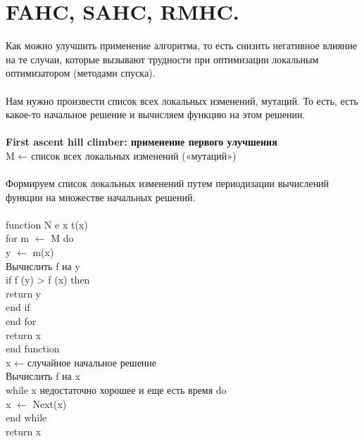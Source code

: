 \newcommand\tab[1][1cm]{\hspace*{#1}}
\section{FAHC, SAHC, RMHC.}

Как можно улучшить применение алгоритма, то есть снизить негативное влияние на те случаи, которые вызывают трудности при оптимизации локальным оптимизатором (методами спуска).\\
\\
Нам нужно произвести список всех локальных изменений, мутаций. То есть, есть какое-то начальное решение и вычисляем функцию на этом решении. \\ 
\\
\textbf{First ascent hill climber: применение первого улучшения}
\\
M ← список всех локальных изменений («мутаций») \\
\\
Формируем список локальных изменений путем периодизации 
вычислений функции на множестве начальных решений. \\
\\
function N e x t(x)  \\
\tab for m $\leftarrow$ M do  \\
\tab \tab y $\leftarrow$ m(x)  \\
\tab \tab Вычислить f на y  \\
\tab \tab if f (y) > f (x) then  \\
\tab \tab \tab return y  \\
\tab \tab end if \\ 
\tab end for  \\
\tab return x  \\
end function  \\

x ← случайное начальное решение  \\
Вычислить f на x  \\
while x недостаточно хорошее и еще есть  время do  \\
\tab x $\leftarrow$ Next(x)  \\
end while  \\
return x \\ 

